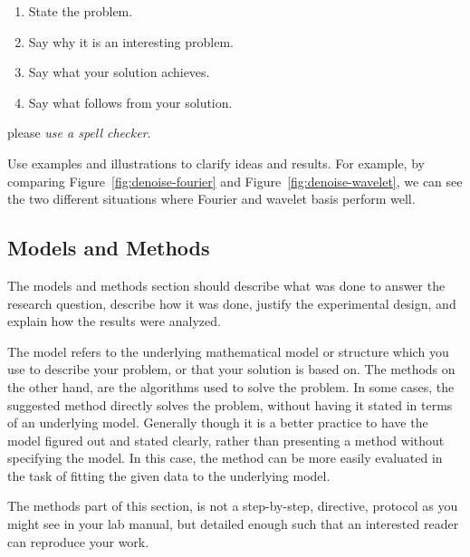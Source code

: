 \documentclass[10pt,conference,compsocconf]{IEEEtran}
\begin{document}
\begin{enumerate}
\item State the problem.
\item Say why it is an interesting problem.
\item Say what your solution achieves.
\item Say what follows from your solution.
\end{enumerate}

please \emph{use a
  spell checker}.


Use examples and illustrations to clarify ideas and results. For
example, by comparing Figure~\ref{fig:denoise-fourier} and
Figure~\ref{fig:denoise-wavelet}, we can see the two different
situations where Fourier and wavelet basis perform well. 

\subsection{Models and Methods}
The models and methods
section should describe what was
done to answer the research question, describe how it was done,
justify the experimental design, and
explain how the results were analyzed.

The model refers to the underlying mathematical model or structure which 
you use to describe your problem, or that your solution is based on. 
The methods on the other hand, are the algorithms used to solve the problem. 
In some cases, the suggested method directly solves the problem, without having it 
stated in terms of an underlying model. Generally though it is a better practice to have 
the model figured out and stated clearly, rather than presenting a method without specifying 
the model. In this case, the method can be more easily evaluated in the task of fitting 
the given data to the underlying model.

The methods part of this section, is not a step-by-step, directive,
protocol as you might see in your lab manual, but detailed enough such
that an interested reader can reproduce your
work.
\end{document}
